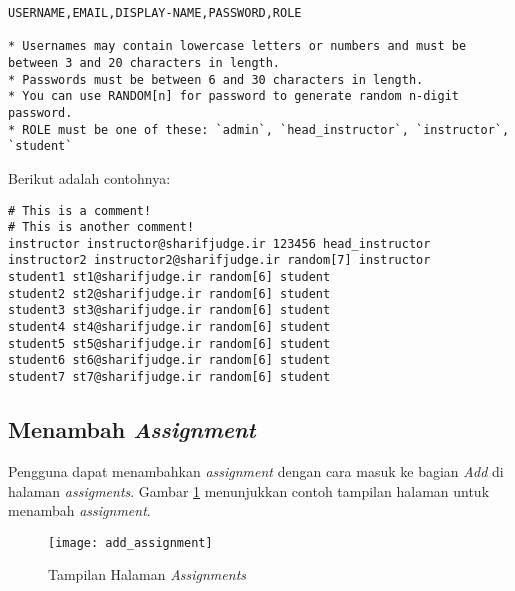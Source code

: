 \begin{lstlisting}[basicstyle=\ttfamily, frame=single,
columns=fullflexible, keepspaces=true, breaklines=true, label=ls:4]
USERNAME,EMAIL,DISPLAY-NAME,PASSWORD,ROLE

* Usernames may contain lowercase letters or numbers and must be between 3 and 20 characters in length.
* Passwords must be between 6 and 30 characters in length.
* You can use RANDOM[n] for password to generate random n-digit password.
* ROLE must be one of these: `admin`, `head_instructor`, `instructor`, `student`
\end{lstlisting}

Berikut adalah contohnya:
\begin{lstlisting}[basicstyle=\ttfamily, frame=single,
columns=fullflexible, keepspaces=true, breaklines=true, label=ls:5]
# This is a comment!
# This is another comment!
instructor instructor@sharifjudge.ir 123456 head_instructor
instructor2 instructor2@sharifjudge.ir random[7] instructor
student1 st1@sharifjudge.ir random[6] student
student2 st2@sharifjudge.ir random[6] student
student3 st3@sharifjudge.ir random[6] student
student4 st4@sharifjudge.ir random[6] student
student5 st5@sharifjudge.ir random[6] student
student6 st6@sharifjudge.ir random[6] student
student7 st7@sharifjudge.ir random[6] student
\end{lstlisting}

\subsection{Menambah \textit{Assignment}}
\label{subsec:add_assignment}
Pengguna dapat menambahkan \textit{assignment} dengan cara masuk ke bagian \textit{Add} di halaman \textit{assigments}. Gambar \ref{fig:add_assignment} menunjukkan contoh tampilan halaman untuk menambah \textit{assignment}.

\begin{figure}[H]
	\centering  
	\texttt{[image: add\_assignment]}  
	\caption[Tampilan Halaman \textit{Assignments}]{Tampilan Halaman \textit{Assignments}} 
	\label{fig:add_assignment} 
\end{figure} 

